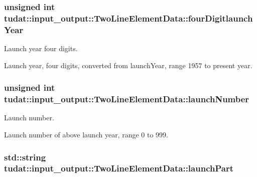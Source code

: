 \subsubsection[{\texorpdfstring{four\+Digitlaunch\+Year}{fourDigitlaunchYear}}]{\setlength{\rightskip}{0pt plus 5cm}unsigned int tudat\+::input\+\_\+output\+::\+Two\+Line\+Element\+Data\+::four\+Digitlaunch\+Year}\hypertarget{structtudat_1_1input__output_1_1TwoLineElementData_af37129b7fb27032aca1b5fe5651cc3ae}{}\label{structtudat_1_1input__output_1_1TwoLineElementData_af37129b7fb27032aca1b5fe5651cc3ae}


Launch year four digits. 

Launch year, four digits, converted from launch\+Year, range 1957 to present year. 
\subsubsection[{\texorpdfstring{launch\+Number}{launchNumber}}]{\setlength{\rightskip}{0pt plus 5cm}unsigned int tudat\+::input\+\_\+output\+::\+Two\+Line\+Element\+Data\+::launch\+Number}\hypertarget{structtudat_1_1input__output_1_1TwoLineElementData_aaf4fc6cacdec819a406fdbe9397be0cc}{}\label{structtudat_1_1input__output_1_1TwoLineElementData_aaf4fc6cacdec819a406fdbe9397be0cc}


Launch number. 

Launch number of above launch year, range 0 to 999. 
\subsubsection[{\texorpdfstring{launch\+Part}{launchPart}}]{\setlength{\rightskip}{0pt plus 5cm}std\+::string tudat\+::input\+\_\+output\+::\+Two\+Line\+Element\+Data\+::launch\+Part}\hypertarget{structtudat_1_1input__output_1_1TwoLineElementData_a8d660e8d0f2819cf40f75f76f3a7f41b}{}\label{structtudat_1_1input__output_1_1TwoLineElementData_a8d660e8d0f2819cf40f75f76f3a7f41b}


